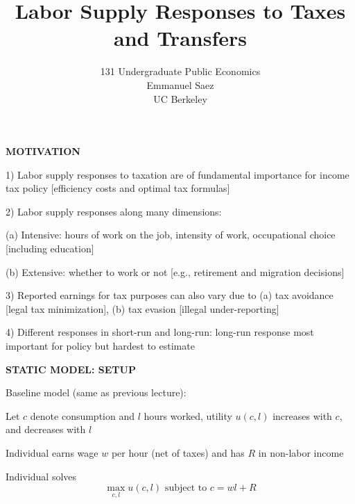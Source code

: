 \documentclass[landscape]{slides}
\author{131 Undergraduate Public Economics \\ Emmanuel Saez \\ UC Berkeley}
\date{}
\title{Labor Supply Responses to Taxes and Transfers} \onlyslides{1-300}
\begin{document}
\begin{slide}
\maketitle
\end{slide}

\begin{slide}
\begin{center}
{\bf MOTIVATION}
\end{center}
1) Labor supply responses to taxation are of fundamental
importance for income tax policy [efficiency costs and optimal tax
formulas]

2) Labor supply responses along many dimensions:

(a) Intensive: hours of work on the job, intensity of work,
occupational choice [including education]

(b) Extensive: whether to work or not [e.g., retirement and
migration decisions]

3) Reported earnings for tax purposes can also vary due to (a) tax
avoidance [legal tax minimization], (b) tax evasion [illegal
under-reporting]

4) Different responses in short-run and long-run: long-run
response most important for policy but hardest to estimate
\end{slide}


\begin{slide}
\begin{center}
{\bf STATIC MODEL: SETUP}
\end{center}
Baseline model (same as previous lecture):

Let $c$ denote consumption and $l$ hours worked, utility $u(c,l)$
increases with $c$, and decreases with $l$

Individual earns wage $w$ per hour (net of taxes) and has $R$ in
non-labor income

Individual solves \[\max_{c,l} u(c,l) \text{ subject to } c=wl+R \]
\end{slide}
\end{document}
